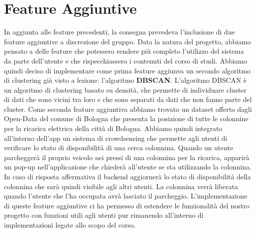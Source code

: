 \documentclass[../../Report.tex]{subfiles}
\begin{document}
    \section{Feature Aggiuntive}
    In aggiunta alle feature precedenti, la consegna prevedeva l'inclusione di due feature aggiuntive a discrezione del gruppo. Data la natura del progetto, abbiamo pensato a delle feature che potessero rendere più completo l'utilizzo del sistema da parte dell'utente e che rispecchiassero i contenuti del corso di studi. Abbiamo quindi deciso di implementare come prima feature aggiunva un secondo algoritmo di clustering già visto a lezione: l'algoritmo \textbf{DBSCAN}. L'algoritmo DBSCAN è un algoritmo di clustering basato su densità, che permette di individuare cluster di dati che sono vicini tra loro e che sono separati da dati che non fanno parte del cluster. Come seconda feature aggiuntiva abbiamo trovato un dataset offerto dagli Open-Data del comune di Bologna che presenta la posizione di tutte le colonnine per la ricarica elettrica della città di Bologna. Abbiamo quindi integrato all'interno dell'app un sistema di crowdsensing che permette agli utenti di verificare lo stato di disponibilità di una cerca colonnina. Quando un utente parcheggerà il proprio veicolo nei pressi di una colonnina per la ricarica, apparirà un pop-up nell'applicazione che chiederà all'utente se sta utilizzando la colonnina. In caso di risposta affermativa il backend aggiornerà lo stato di disponibilità della colonnina che sarà quindi visibile agli altri utenti. La colonnina verrà liberata quando l'utente che l'ha occupata avrà lasciato il parcheggio. L'implementazione di queste feature aggiuntive ci ha permesso di estendere le funzionalità del nostro progetto con funzioni utili agli utenti pur rimanendo all'interno di implementazioni legate allo scopo del corso. \\
    
\end{document}
